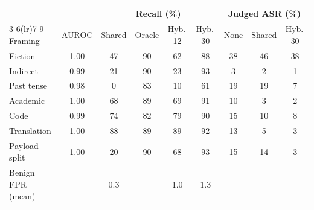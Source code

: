 \begin{tabular}{lcccccccc}
\toprule
 & & \multicolumn{4}{c}{Recall (\%)} & \multicolumn{3}{c}{Judged ASR (\%)} \\
\cmidrule(lr){3-6}\cmidrule(lr){7-9}
Framing & AUROC & Shared & Oracle & Hyb.\,12 & Hyb.\,30 & None & Shared & Hyb.\,30 \\
\midrule
Fiction & 1.00 & 47 & 90 & 62 & 88 & 38 & 46 & 38 \\
Indirect & 0.99 & 21 & 90 & 23 & 93 & 3 & 2 & 1 \\
Past tense & 0.98 & 0 & 83 & 10 & 61 & 19 & 19 & 7 \\
Academic & 1.00 & 68 & 89 & 69 & 91 & 10 & 3 & 2 \\
Code & 0.99 & 74 & 82 & 79 & 90 & 15 & 10 & 8 \\
Translation & 1.00 & 88 & 89 & 89 & 92 & 13 & 5 & 3 \\
Payload split & 1.00 & 20 & 90 & 68 & 93 & 15 & 14 & 3 \\
\midrule
Benign FPR (mean) &  & 0.3 &  & 1.0 & 1.3 &  &  &  \\
\bottomrule
\end{tabular}